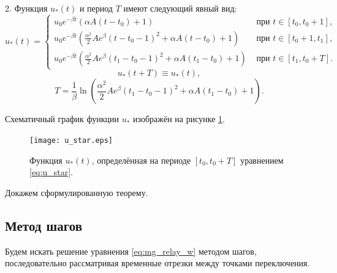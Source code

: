 \begin{theorem}
	2. Функция $u_*(t)$ и период $T$ имеют следующий явный вид: 
	\small
	\begin{equation}
		\label{eq:u_star}
		u_*(t)=
		\begin{cases}
			u_0 e^{-\beta t}(\alpha A(t-t_0)+1) & \text{ при } t\in[t_0,t_0+1],
			\\
			u_0 e^{-\beta t}\left(\frac{\alpha^2}{2}Ae^{\beta}(t-t_0-1)^2+\alpha A(t-t_0)+1\right) & \text{ при } t\in[t_0+1,t_1],
			\\
			u_0 e^{-\beta t}\left(\frac{\alpha^2}{2}Ae^{\beta}(t_1-t_0-1)^2+\alpha A(t_1-t_0)+1\right) & \text{ при } t\in[t_1,t_0+T].
		\end{cases}
	\end{equation}
	\normalsize
	\[
	u_*(t+T)\equiv u_*(t),
	\]
	\begin{equation}
		\label{eq:mg_period_T}
		T = \dfrac{1}{\beta}\ln\left( \frac{\alpha^2}{2}Ae^{\beta}(t_1-t_0-1)^2+\alpha A(t_1-t_0)+1\right). 
	\end{equation}
\end{theorem}

Схематичный график функции $u_*$ изображён на рисунке \ref{fig:u_star}.
%
\begin{figure}[h]
	\centering
	\texttt{[image: u\_star.eps]}
	\caption{Функция $u_*(t)$, определённая на периоде $[t_0, t_0 + T]$ уравнением \eqref{eq:u_star}.}
	\label{fig:u_star}
\end{figure}

Докажем сформулированную теорему.

\subsection{Метод шагов}\label{ch2:sect2:subsect2}

Будем искать решение уравнения \eqref{eq:mg_relay_w} методом шагов, последовательно рассматривая временные отрезки между точками переключения. 

